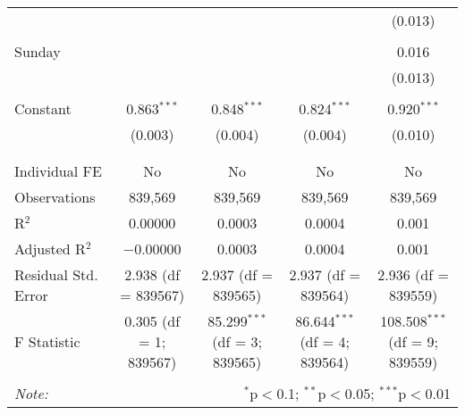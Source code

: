 \documentclass[
]{article}
\begin{document}
\begin{table}[!htbp]
{\begin{tabular}{@{\extracolsep{5pt}}lcccc}
  &  &  &  & (0.013) \\ 
  & & & & \\ 
 Sunday &  &  &  & 0.016 \\ 
  &  &  &  & (0.013) \\ 
  & & & & \\ 
 Constant & 0.863$^{***}$ & 0.848$^{***}$ & 0.824$^{***}$ & 0.920$^{***}$ \\ 
  & (0.003) & (0.004) & (0.004) & (0.010) \\ 
  & & & & \\ 
\hline \\[-1.8ex] 
Individual FE & No & No & No & No \\ 
Observations & 839,569 & 839,569 & 839,569 & 839,569 \\ 
R$^{2}$ & 0.00000 & 0.0003 & 0.0004 & 0.001 \\ 
Adjusted R$^{2}$ & $-$0.00000 & 0.0003 & 0.0004 & 0.001 \\ 
Residual Std. Error & 2.938 (df = 839567) & 2.937 (df = 839565) & 2.937 (df = 839564) & 2.936 (df = 839559) \\ 
F Statistic & 0.305 (df = 1; 839567) & 85.299$^{***}$ (df = 3; 839565) & 86.644$^{***}$ (df = 4; 839564) & 108.508$^{***}$ (df = 9; 839559) \\ 
\hline 
\hline \\[-1.8ex] 
\textit{Note:}  & \multicolumn{4}{r}{$^{*}$p$<$0.1; $^{**}$p$<$0.05; $^{***}$p$<$0.01} \\ 
\end{tabular}
} 
\end{table} 
\newpage
\end{document}
